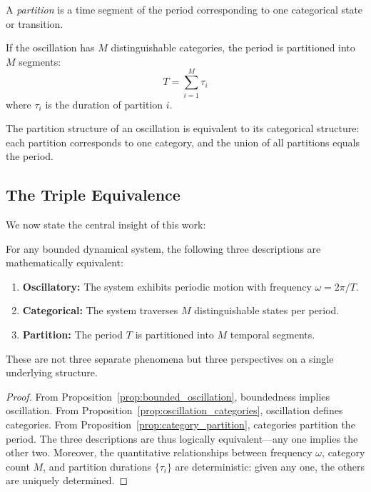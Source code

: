 \begin{definition}[Partition]
A \textit{partition} is a time segment of the period corresponding to one categorical state or transition.
\end{definition}

If the oscillation has $M$ distinguishable categories, the period is partitioned into $M$ segments:
\begin{equation}
T = \sum_{i=1}^{M} \tau_i
\end{equation}
where $\tau_i$ is the duration of partition $i$.

\begin{proposition}
\label{prop:category_partition}
The partition structure of an oscillation is equivalent to its categorical structure: each partition corresponds to one category, and the union of all partitions equals the period.
\end{proposition}

\subsection{The Triple Equivalence}

We now state the central insight of this work:

\begin{theorem}
\label{thm:triple_equivalence}
For any bounded dynamical system, the following three descriptions are mathematically equivalent:
\begin{enumerate}
\item \textbf{Oscillatory:} The system exhibits periodic motion with frequency $\omega = 2\pi/T$.
\item \textbf{Categorical:} The system traverses $M$ distinguishable states per period.
\item \textbf{Partition:} The period $T$ is partitioned into $M$ temporal segments.
\end{enumerate}
These are not three separate phenomena but three perspectives on a single underlying structure.
\end{theorem}

\begin{proof}
From Proposition~\ref{prop:bounded_oscillation}, boundedness implies oscillation. From Proposition~\ref{prop:oscillation_categories}, oscillation defines categories. From Proposition~\ref{prop:category_partition}, categories partition the period. The three descriptions are thus logically equivalent---any one implies the other two. Moreover, the quantitative relationships between frequency $\omega$, category count $M$, and partition durations $\{\tau_i\}$ are deterministic: given any one, the others are uniquely determined.
\end{proof}

